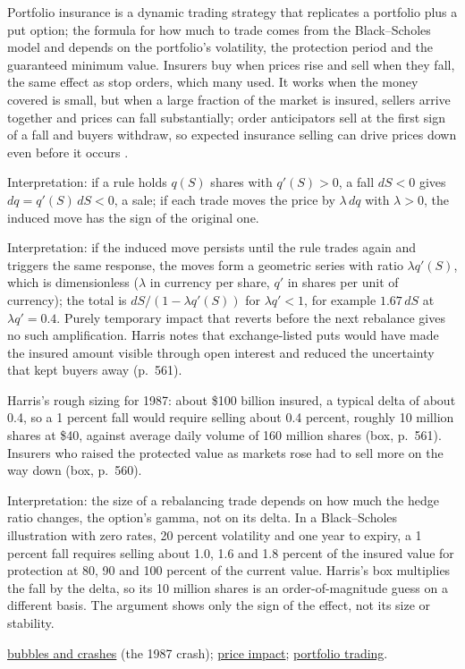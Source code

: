 \begin{qfmechanism}\label{mech:positive-feedback-hedging}
 Portfolio insurance is a dynamic trading strategy that replicates a portfolio plus a put option; the formula for how much to trade comes from the Black--Scholes model and depends on the portfolio's volatility, the protection period and the guaranteed minimum value. Insurers buy when prices rise and sell when they fall, the same effect as stop orders, which many used. It works when the money covered is small, but when a large fraction of the market is insured, sellers arrive together and prices can fall substantially; order anticipators sell at the first sign of a fall and buyers withdraw, so expected insurance selling can drive prices down even before it occurs \citep[chap.~``Bubbles, Crashes, and Circuit Breakers'', sec.~28.2.2, pp.~560--561]{alpha-harris}.

Interpretation: if a rule holds $q(S)$ shares with $q'(S)>0$, a fall $dS<0$ gives $dq=q'(S)\,dS<0$, a sale; if each trade moves the price by $\lambda\,dq$ with $\lambda>0$, the induced move has the sign of the original one.

 Interpretation: if the induced move persists until the rule trades again and triggers the same response, the moves form a geometric series with ratio $\lambda q'(S)$, which is dimensionless ($\lambda$ in currency per share, $q'$ in shares per unit of currency); the total is $dS/(1-\lambda q'(S))$ for $\lambda q'<1$, for example $1.67\,dS$ at $\lambda q'=0.4$. Purely temporary impact that reverts before the next rebalance gives no such amplification. Harris notes that exchange-listed puts would have made the insured amount visible through open interest and reduced the uncertainty that kept buyers away (p.~561).

 Harris's rough sizing for 1987: about \$100 billion insured, a typical delta of about 0.4, so a 1 percent fall would require selling about 0.4 percent, roughly 10 million shares at \$40, against average daily volume of 160 million shares (box, p.~561). Insurers who raised the protected value as markets rose had to sell more on the way down (box, p.~560).

 Interpretation: the size of a rebalancing trade depends on how much the hedge ratio changes, the option's gamma, not on its delta. In a Black--Scholes illustration with zero rates, 20 percent volatility and one year to expiry, a 1 percent fall requires selling about 1.0, 1.6 and 1.8 percent of the insured value for protection at 80, 90 and 100 percent of the current value. Harris's box multiplies the fall by the delta, so its 10 million shares is an order-of-magnitude guess on a different basis. The argument shows only the sign of the effect, not its size or stability.

 \hyperref[mech:bubble-crash-dynamics]{bubbles and crashes} (the 1987 crash); \hyperref[def:price-impact]{price impact}; \hyperref[def:portfolio-trading]{portfolio trading}.

\end{qfmechanism}
